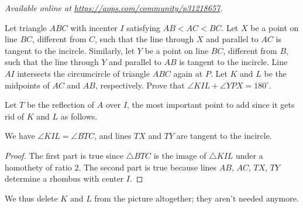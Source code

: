 \textsl{Available online at \url{https://aops.com/community/p31218657}.}
\begin{mdframed}[style=mdpurplebox,frametitle={Problem statement}]
Let triangle $ABC$ with incenter $I$ satisfying $AB < AC < BC$.
Let $X$ be a point on line $BC$, different from $C$,
such that the line through $X$ and parallel to $AC$ is tangent to the incircle.
Similarly, let $Y$ be a point on line $BC$, different from $B$,
such that the line through $Y$ and parallel to $AB$ is tangent to the incircle.
Line $AI$ intersects the circumcircle of triangle $ABC$ again at $P$.
Let $K$ and $L$ be the midpoints of $AC$ and $AB$, respectively.
Prove that $\angle KIL + \angle YPX = 180^{\circ}$.
\end{mdframed}
Let $T$ be the reflection of $A$ over $I$, the most important point to add
since it gets rid of $K$ and $L$ as follows.
\begin{claim*}
  We have $\angle KIL = \angle BTC$,
  and lines $TX$ and $TY$ are tangent to the incircle.
\end{claim*}
\begin{proof}
  The first part is true since $\triangle BTC$ is the image of $\triangle KIL$
  under a homothety of ratio $2$.
  The second part is true because lines $AB$, $AC$, $TX$, $TY$
  determine a rhombus with center $I$.
\end{proof}

We thus delete $K$ and $L$ from the picture altogether; they aren't needed anymore.

